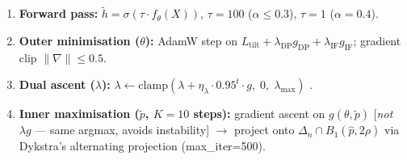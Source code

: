 \documentclass[11pt,a4paper]{article}
\newcommand{\htilde}{\tilde{h}}
\newcommand{\ptilde}{\tilde{p}}
\newcommand{\lDP}{\lambda_{\mathrm{DP}}}
\newcommand{\lIF}{\lambda_{\mathrm{IF}}}
\newcommand{\gDP}{g_{\mathrm{DP}}}
\newcommand{\gIF}{g_{\mathrm{IF}}}
\newcommand{\Ltilt}{L_{\mathrm{tilt}}}
\begin{document}
\begin{enumerate}
\item \textbf{Forward pass:}\; $\htilde = \sigma(\tau\cdot f_\theta(X))$,\quad
      $\tau=100$ ($\alpha\le 0.3$), $\tau=1$ ($\alpha=0.4$).
\item \textbf{Outer minimisation ($\theta$):}\;
      AdamW step on $\Ltilt+\lDP\gDP+\lIF\gIF$;\;
      gradient clip $\|\nabla\|\le 0.5$.
\item \textbf{Dual ascent ($\lambda$):}\;
      $\lambda \leftarrow \mathrm{clamp}\!\left(\lambda
      +\eta_\lambda\cdot 0.95^t\cdot g,\;0,\;\lambda_{\max}\right)$
      .
\item \textbf{Inner maximisation ($\ptilde$, $K=10$ steps):}\;
      gradient ascent on $g(\theta,\ptilde)$
      [\emph{not} $\lambda g$ --- same argmax, avoids instability]
      $\to$ project onto $\Delta_n\cap B_1(\hat{p},2\rho)$
      via Dykstra's alternating projection (max\_iter=500).
\end{enumerate}
\end{document}
